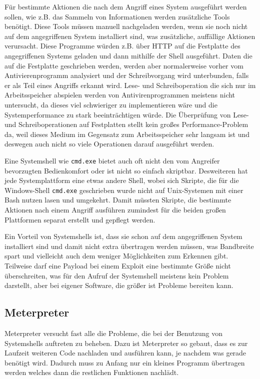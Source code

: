 Für bestimmte Aktionen die nach dem Angriff eines System ausgeführt
werden sollen, wie z.B. das Sammeln von Informationen werden zusätzliche
Tools benötigt. Diese Tools müssen manuell nachgeladen werden, wenn sie
noch nicht auf dem angegriffenen System installiert sind, was
zusätzliche, auffällige Aktionen verursacht. Diese Programme würden z.B.
über HTTP auf die Festplatte des angegriffenen Systems geladen und dann
mithilfe der Shell ausgeführt. Daten die auf die Festplatte geschrieben
werden, werden aber normalerweise vorher vom Antivierenprogramm
analysiert und der Schreibvorgang wird unterbunden, falls er als Teil
eines Angriffs erkannt wird. Lese- und Schreiboperation die sich nur im
Arbeitsspeicher abspielen werden von Antivirenprogrammen meistens nicht
untersucht, da dieses viel schwieriger zu implementieren wäre und die
Systemperformance zu stark beeinträchtigen würde. Die Überprüfung von
Lese- und Schreiboperationen auf Festplatten stellt kein großes
Performance-Problem da, weil dieses Medium im Gegensatz zum
Arbeitsspeicher sehr langsam ist und deswegen auch nicht so viele
Operationen darauf ausgeführt werden.

Eine Systemshell wie \texttt{cmd.exe} bietet auch oft nicht den vom
Angreifer bevorzugten Bedienkomfort oder ist nicht so einfach skriptbar.
Desweiteren hat jede Systemplattform eine etwas andere Shell, wobei sich
Skripte, die für die Windows-Shell \texttt{cmd.exe} geschrieben wurde
nicht auf Unix-Systemen mit einer Bash nutzen lasen und umgekehrt. Damit
müssten Skripte, die bestimmte Aktionen nach einem Angriff ausführen
zumindest für die beiden großen Plattformen separat erstellt und gepflegt
werden.

Ein Vorteil von Systemshells ist, dass sie schon auf dem angegriffenen
System installiert sind und damit nicht extra übertragen werden müssen,
was Bandbreite spart und vielleicht auch dem  weniger
Möglichkeiten zum Erkennen gibt. Teilweise darf eine Payload bei einem
Exploit eine bestimmte Größe nicht überschreiten, was für den Aufruf der
Systemshell meistens kein Problem darstellt, aber bei eigener Software,
die größer ist Probleme bereiten kann.

\subsection{Meterpreter}
\label{compositions:meterpreter:meterpreter}

Meterpreter versucht fast alle die Probleme, die bei der Benutzung von
Systemshells auftreten zu beheben. Dazu ist Meterpreter so gebaut, dass
es zur Laufzeit weiteren Code nachladen und ausführen kann, je nachdem
was gerade benötigt wird. Dadurch muss zu Anfang nur ein kleines
Programm übertragen werden welches dann die restlichen Funktionen
nachlädt.

